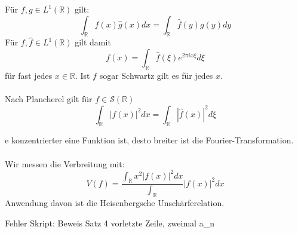 \documentclass[11pt]{article}
\newenvironment{problem}[1]{
    \begin{trivlist}
        \item[\hskip \labelsep {\bfseries #1}] }{
    \end{trivlist}\normalshape
}
\newcommand{\R}{\mathbb{R}}
\begin{document}
    \begin{problem}{Eigenschaften der Fouriertransofrmation}
        Für $f,g\in L^1(\R)$ gilt:
        $$\int_{\R} f(x)\hat{g}(x) dx = \int_\R \hat{f}(y) g(y)dy$$
        Für $f,\hat{f}\in L^1(\R)$ gilt damit
        $$f(x) = \int_\R \hat{f}(\xi) e^{2\pi i x\xi} d\xi$$
        für fast jedes $x\in \R$. Ist $f$ sogar Schwartz gilt
        es für jedes $x$. \\\\
        Nach Plancherel gilt für $f\in\mathcal{S}(\R)$
        $$\int_{\R}|f(x)|^2 dx=\int_{\R}|\hat{f}(x)|^2 d\xi $$
    \end{problem}

    \begin{problem}
        Je konzentrierter eine Funktion ist, desto breiter ist die
        Fourier-Transformation. \\\\
        Wir messen die Verbreitung mit:
        $$V(f) = \frac{\int_\R x^2 |f(x)|^2 dx}{\int_\R}|f(x)|^2 dx$$
        Anwendung davon ist die Heisenbergsche Unschärferelation. 
    \end{problem}

    Fehler Skript: Beweis Satz 4 vorletzte Zeile, zweimal a_n 
\end{document}
